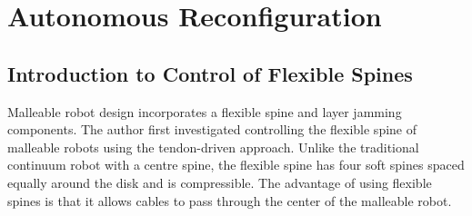 








\section{Autonomous Reconfiguration}

\subsection{Introduction to Control of Flexible Spines}

Malleable robot design incorporates a flexible spine and layer jamming components. The author first investigated controlling the flexible spine of malleable robots using the tendon-driven approach. Unlike the traditional continuum robot with a centre spine, the flexible spine has four soft spines spaced equally around the disk and is compressible. The advantage of using flexible spines is that it allows cables to pass through the center of the malleable robot. 

